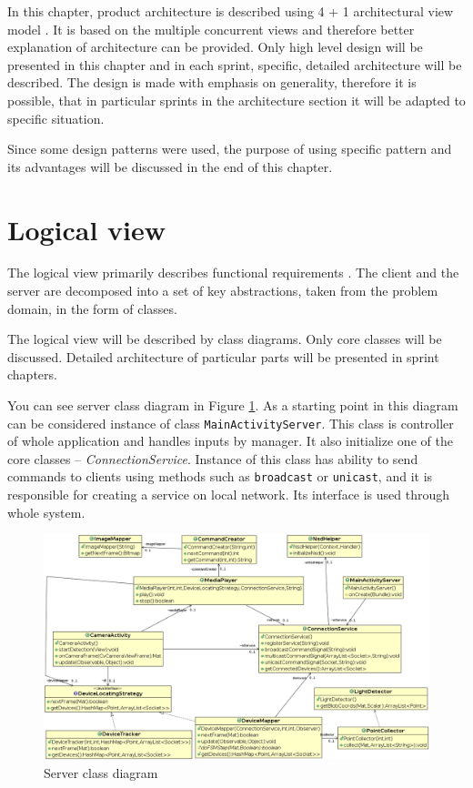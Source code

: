 In this chapter, product architecture is described using 4 + 1 architectural view model \cite{Kruchten:1995:VMA:624610.625529}. It is based on the multiple concurrent views and therefore better explanation of architecture can be provided.
Only high level design will be presented in this chapter and in each sprint, specific, detailed architecture will be described.
The design is made with emphasis on generality, therefore it is possible, that in particular sprints in the architecture section it will be adapted to specific situation.

Since some design patterns were used, the purpose of using specific pattern and its advantages will be discussed in the end of this chapter.

\section{Logical view}
The logical view  primarily describes functional requirements \cite[p.~3]{Kruchten:1995:VMA:624610.625529}. 
The client and the server are decomposed into a set of key abstractions, taken from the problem domain, in the form of classes. 

The logical view will be described by class diagrams.
Only core classes will be discussed. 
Detailed architecture of particular parts will be presented in sprint chapters.

You can see server class diagram in Figure \ref{fig:architecture_class_diagram_server}.
As a starting point in this diagram can be considered instance of class \texttt{MainActivityServer}.
This class is controller of whole application and handles inputs by manager.
It also initialize one of the core classes -- \emph{ConnectionService}.
Instance of this class has ability to send commands to clients using methods such as \texttt{broadcast} or \texttt{unicast}, and it is responsible for creating a service on local network.
Its interface is used through whole system.
\begin{figure}[!h]
	\centering
		\includegraphics[width=20cm, angle=90]{softwareArchitecture/class_diagram_server.png}
	\caption{Server class diagram}
	\label{fig:architecture_class_diagram_server}
\end{figure}

